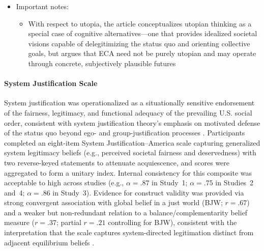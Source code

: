 \documentclass[jou,floatsintext]{apa7}
\begin{document}
\begin{itemize}
    \item Important notes:
    \begin{itemize}
        \item With respect to utopia, the article conceptualizes utopian thinking as a special case of cognitive alternatives—one that provides idealized societal visions capable of delegitimizing the status quo and orienting collective goals, but argues that ECA need not be purely utopian and may operate through concrete, subjectively plausible futures \parencite{lutzExperimentallyElevatingEnvironmental2025}
    \end{itemize}
\end{itemize}



\paragraph{System Justification Scale}

System justification was operationalized as a situationally sensitive endorsement of the fairness, legitimacy, and functional adequacy of the prevailing U.S. social order, consistent with system justification theory’s emphasis on motivated defense of the status quo beyond ego- and group-justification processes \parencite{kayComplementaryJusticeEffects2003}. Participants completed an eight-item System Justification--America scale capturing generalized system legitimacy beliefs (e.g., perceived societal fairness and deservedness) with two reverse-keyed statements to attenuate acquiescence, and scores were aggregated to form a unitary index. Internal consistency for this composite was acceptable to high across studies (e.g., $\alpha=.87$ in Study~1; $\alpha=.75$ in Studies~2 and~4; $\alpha=.86$ in Study~3). Evidence for construct validity was provided via strong convergent association with global belief in a just world (BJW; $r=.67$) and a weaker but non-redundant relation to a balance/complementarity belief measure ($r=.37$; partial $r=.21$ controlling for BJW), consistent with the interpretation that the scale captures system-directed legitimation distinct from adjacent equilibrium beliefs \parencite{kayComplementaryJusticeEffects2003}.
\end{document}
